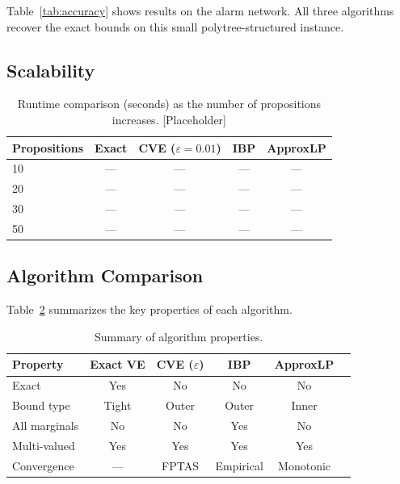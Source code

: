 \documentclass{article}
\begin{document}
Table~\ref{tab:accuracy} shows results on the alarm network. All three algorithms recover the exact bounds on this small polytree-structured instance.


\subsection{Scalability}

\begin{table}[t]
\caption{Runtime comparison (seconds) as the number of propositions increases. [Placeholder]}
\label{tab:scalability}
\centering
\begin{small}
\begin{tabular}{lcccc}
\toprule
\textbf{Propositions} & \textbf{Exact} & \textbf{CVE ($\varepsilon{=}0.01$)} & \textbf{IBP} & \textbf{ApproxLP} \\
\midrule
10  & --- & --- & --- & --- \\
20  & --- & --- & --- & --- \\
30  & --- & --- & --- & --- \\
50  & --- & --- & --- & --- \\
\bottomrule
\end{tabular}
\end{small}
\end{table}


\subsection{Algorithm Comparison}

Table~\ref{tab:comparison} summarizes the key properties of each algorithm.

\begin{table}[t]
\caption{Summary of algorithm properties.}
\label{tab:comparison}
\centering
\begin{small}
\begin{tabular}{lccccc}
\toprule
\textbf{Property} & \textbf{Exact VE} & \textbf{CVE ($\varepsilon$)} & \textbf{IBP} & \textbf{ApproxLP} \\
\midrule
Exact & Yes & No & No & No \\
Bound type & Tight & Outer & Outer & Inner \\
All marginals & No & No & Yes & No \\
Multi-valued & Yes & Yes & Yes & Yes \\
Convergence & --- & FPTAS & Empirical & Monotonic \\
\bottomrule
\end{tabular}
\end{small}
\end{table}
\end{document}
